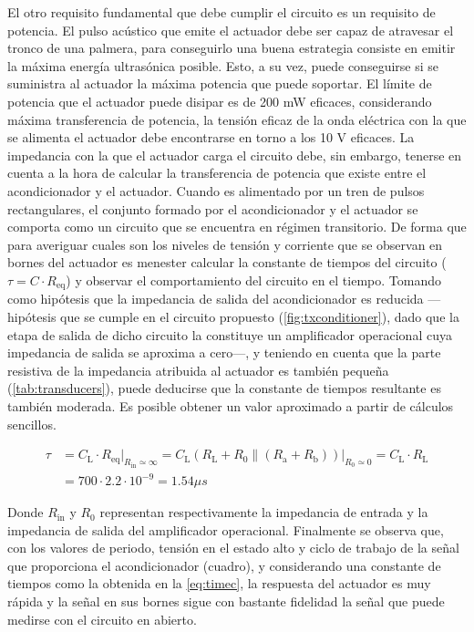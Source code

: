 El otro requisito fundamental que debe cumplir el circuito es un requisito
de potencia. El pulso acústico que emite el actuador debe ser capaz de
atravesar el tronco de una palmera, para conseguirlo una buena estrategia
consiste en emitir la máxima energía ultrasónica posible. Esto, a su vez,
puede conseguirse si se suministra al actuador la máxima potencia que puede
soportar. El límite de potencia que el actuador puede disipar es de 200 mW
eficaces, considerando máxima transferencia de potencia, la tensión eficaz
de la onda eléctrica con la que se alimenta el actuador debe encontrarse en
torno a los 10 V eficaces. La impedancia con la que el actuador carga el
circuito debe, sin embargo, tenerse en cuenta a la hora de calcular la
transferencia de potencia que existe entre el acondicionador y el actuador.
Cuando es alimentado por un tren de pulsos rectangulares, el conjunto
formado por el acondicionador y el actuador se comporta como un circuito
 que se encuentra en régimen transitorio. De forma que para
averiguar cuales son los niveles de tensión y corriente que se observan en
bornes del actuador es menester calcular la constante de tiempos del
circuito ($\tau = C\cdot R_\text{eq}$) y observar el comportamiento del
circuito en el tiempo. Tomando como hipótesis que la impedancia de salida
del acondicionador es reducida ---hipótesis que se cumple en el circuito
propuesto (\cref{fig:txconditioner}), dado que la etapa de salida de dicho
circuito la constituye un amplificador operacional cuya impedancia de
salida se aproxima a cero---, y teniendo en cuenta que la parte resistiva
de la impedancia atribuida al actuador es también pequeña
(\cref{tab:transducers}), puede deducirse que la constante de tiempos
resultante es también moderada. Es posible obtener un valor aproximado a
partir de cálculos sencillos.

\begin{equation}\label{eq:timec}
	\begin{split}
		\tau &= C_\text{L}\cdot R_\text{eq}
		\Big|_{R_\text{in}\simeq\infty} =
		C_\text{L}\left(R_\text{L} + R_0\|(R_\text{a} +
		R_\text{b})\right)\Big|_{R_0 \simeq 0} =
		C_\text{L}\cdot R_\text{L} \\
		&= 700\cdot2.2\cdot 10^{-9} = 1.54\mu s
	\end{split}
\end{equation}

Donde $R_\text{in}$ y $R_\text{0}$ representan respectivamente la
impedancia de entrada y la impedancia de salida del amplificador
operacional. Finalmente se observa que, con los valores de periodo, tensión
en el estado alto y ciclo de trabajo de la señal que proporciona el
acondicionador (cuadro), y considerando una constante de tiempos como la
obtenida en la \cref{eq:timec}, la respuesta del actuador es muy rápida y
la señal en sus bornes sigue con bastante fidelidad la señal que puede
medirse con el circuito en abierto.


